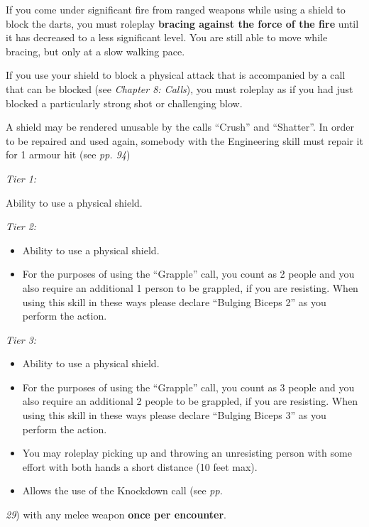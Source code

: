 \documentclass{scrbook}
\begin{document}
If you come under significant fire from ranged weapons while using a shield to block the darts, you must roleplay \textbf{bracing against the force of the fire} until it has decreased to a less significant level. You are still able to move while bracing, but only at a slow walking pace.

If you use your shield to block a physical attack that is accompanied by a call that can be blocked (see \textit{Chapter 8: Calls}), you must roleplay as if you had just blocked a particularly strong shot or challenging blow.

A shield may be rendered unusable by the calls ``Crush'' and ``Shatter''. In order to be repaired and used again, somebody with the Engineering skill must repair it for 1 armour hit (see \textit{pp. 94})

\textit{Tier 1:}

Ability to use a physical shield.

\textit{Tier 2:}

\begin{itemize}
\item Ability to use a physical shield.

\item For the purposes of using the ``Grapple'' call, you count as 2 people and you also require an additional 1 person to be grappled, if you are resisting. When using this skill in these ways please declare ``Bulging Biceps 2'' as you perform the action.

\end{itemize}
\textit{Tier 3:}

\begin{itemize}
\item Ability to use a physical shield.

\item For the purposes of using the ``Grapple'' call, you count as 3 people and you also require an additional 2 people to be grappled, if you are resisting. When using this skill in these ways please declare ``Bulging Biceps 3'' as you perform the action.

\item You may roleplay picking up and throwing an unresisting person with some effort with both hands a short distance (10 feet max).

\item Allows the use of the Knockdown call (see \textit{pp.}

\end{itemize}
\textit{29}) with any melee weapon \textbf{once per encounter}.
\end{document}
